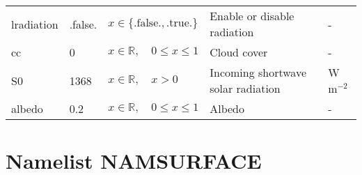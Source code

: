 \documentclass[twoside,11pt,fleqn,a4paper,english,openright]{report}
\begin{document}
\begin{center}
  \tablehead{
  }
  \tablelasttail{
        &&&&\\\hline
  }
\begin{supertabular}{|l|p{1.6cm}|p{4cm}|p{6.3cm}|l|}
  lradiation	&	.false.	&	$x\in\{\text{.false.},\text{.true.}\}$	& Enable or disable radiation	& -\\
  cc		&	0		&	$x \in \mathbb{R}, \quad 0 \leq x \leq 1$		& Cloud cover	&	-\\
  S0		&	1368	&	$x \in \mathbb{R}, \quad  x > 0$		& Incoming shortwave solar radiation	&	W m$^{-2}$\\
  albedo	&	0.2		&	$x \in \mathbb{R}, \quad 0 \leq x \leq 1$		& Albedo	&	-\\
\end{supertabular}
\end{center}

\section{Namelist NAMSURFACE}\label{par:namsurface}
\end{document}
